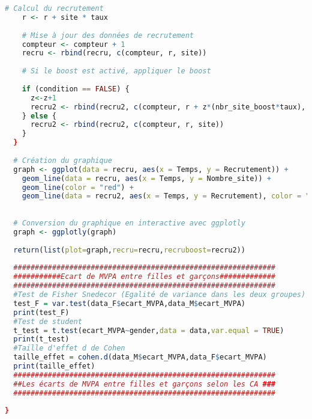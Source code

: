 \documentclass{article}
\begin{document}
\begin{lstlisting}[language=R]
    # Calcul du recrutement
    r <- r + site * taux
    
    # Mise à jour des données de recrutement
    compteur <- compteur + 1
    recru <- rbind(recru, c(compteur, r, site))
    
    # Si le boost est activé, appliquer le boost 
    
    if (condition == FALSE) {
      z<-z+1
      recru2 <- rbind(recru2, c(compteur, r + z*(nbr_site_boost*taux), site))
    } else {
      recru2 <- rbind(recru2, c(compteur, r, site))
    }
  }
  
  # Création du graphique
  graph <- ggplot(data = recru, aes(x = Temps, y = Recrutement)) + 
    geom_line(data = recru, aes(x = Temps, y = Nombre_site)) +
    geom_line(color = "red") +
    geom_line(data = recru2, aes(x = Temps, y = Recrutement), color = "orange") 
  
  
  # Conversion du graphique en interactive avec ggplotly
  graph <- ggplotly(graph)
  
  return(list(plot=graph,recru=recru,recruboost=recru2))
  
  ############################################################# 
  ###########Ecart de MVPA entre filles et garçons#############
  #############################################################
  #Test de Fisher Snedecor (Egalité de variance dans les deux groupes)
  test_F = var.test(data_F$ecart_MVPA,data_M$ecart_MVPA)
  print(test_F)
  #Test de student
  t_test = t.test(ecart_MVPA~gender,data = data,var.equal = TRUE)
  print(t_test)
  #Taille d'effet d de Cohen
  taille_effet = cohen.d(data_M$ecart_MVPA,data_F$ecart_MVPA)
  print(taille_effet)
  ############################################################# 
  ##Les écarts de MVPA entre filles et garçons selon les CA ###
  #############################################################
  
}

\end{lstlisting}
\end{document}
